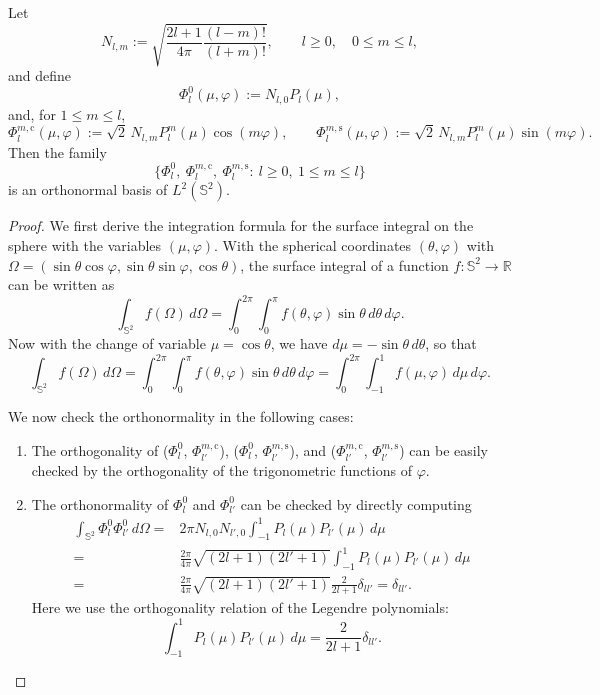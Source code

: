 \documentclass[10pt,a4paper]{amsart}
\begin{document}
\begin{thm}\label{thm:real-sph-harm-orthonormal}
Let
\[
N_{l,m}:=\sqrt{\frac{2l+1}{4\pi}\frac{(l-m)!}{(l+m)!}},
\qquad l\ge 0,\quad 0\le m\le l,
\]
and define
\[
\Phi_l^0(\mu,\varphi):=N_{l,0}P_l(\mu),
\]
and, for \(1\le m\le l\),
\[
\Phi_l^{m,\mathrm c}(\mu,\varphi)
:=\sqrt{2}\,N_{l,m}P_l^m(\mu)\cos(m\varphi),
\qquad
\Phi_l^{m,\mathrm s}(\mu,\varphi)
:=\sqrt{2}\,N_{l,m}P_l^m(\mu)\sin(m\varphi).
\]
Then the family
\[
\bigl\{\Phi_l^0,\ \Phi_l^{m,\mathrm c},\ \Phi_l^{m,\mathrm s}
:\ l\ge 0,\ 1\le m\le l\bigr\}
\]
is an orthonormal basis of \(L^2(\mathbb S^2)\).
\end{thm}

\begin{proof}
    We first derive the integration formula for the surface integral on the sphere with the variables \((\mu,\varphi)\). With the spherical coordinates \((\theta,\varphi)\) with $\Omega = (\sin\theta\cos\varphi,\sin\theta\sin\varphi,\cos\theta)$, the surface integral of a function \(f:\mathbb S^2\to\mathbb R\) can be written as
    \begin{equation}
    \int_{\mathbb S^2} f(\Omega)\,d\Omega = \int_0^{2\pi}\int_0^\pi f(\theta,\varphi)\sin\theta\,d\theta\,d\varphi.
    \end{equation}
    Now with the change of variable $\mu=\cos\theta$, we have $d\mu=-\sin\theta\,d\theta$, so that
    \[
    \int_{\mathbb S^2} f(\Omega)\,d\Omega
    =
    \int_0^{2\pi}\int_0^\pi f(\theta,\varphi)\sin\theta\,d\theta\,d\varphi
    =
    \int_0^{2\pi}\int_{-1}^1 f(\mu,\varphi)\,d\mu\,d\varphi.
    \]

    We now check the orthonormality in the following cases: 
    \begin{enumerate}

    \item 
    The orthogonality of (\(\Phi_l^0\), \(\Phi_{l'}^{m,\mathrm c}\)), (\(\Phi_l^0\), \(\Phi_{l'}^{m,\mathrm s}\)), and (\(\Phi_{l'}^{m,\mathrm c}\), \(\Phi_{l'}^{m,\mathrm s}\)) can be easily checked by the orthogonality of the trigonometric functions of \(\varphi\).

    \item 
    The orthonormality of $\Phi_l^0$ and $\Phi_{l'}^0$ can be checked by directly computing
    \begin{equation}
    \begin{aligned}
        \int_{\mathbb S^2}\Phi_l^0\Phi_{l'}^0\,d\Omega ={}&
        2\pi N_{l,0}N_{l',0}\int_{-1}^1 P_l(\mu)P_{l'}(\mu)\,d\mu \\
        ={}& \frac{2\pi}{4\pi}\sqrt{(2l+1)(2l'+1)}\int_{-1}^1 P_l(\mu)P_{l'}(\mu)\,d\mu \\
        ={}& \frac{2\pi}{4\pi}\sqrt{(2l+1)(2l'+1)} \frac{2}{2l+1} \delta_{ll'} = \delta_{ll'}.
    \end{aligned}
    \end{equation}
    Here we use the orthogonality relation of the Legendre polynomials:
    \begin{equation}
        \int_{-1}^1 P_l(\mu)P_{l'}(\mu)\,d\mu = \frac{2}{2l+1}\delta_{ll'}.
    \end{equation}


\end{enumerate}
\end{proof}
\end{document}
